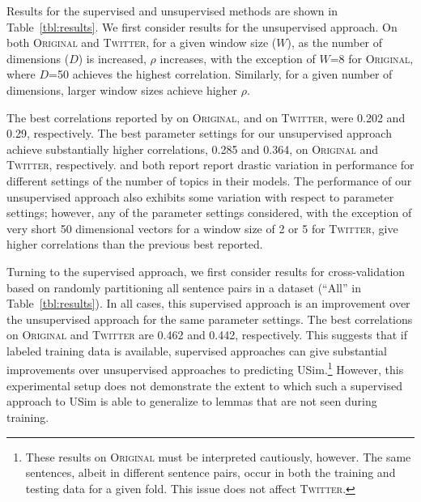 \documentclass[11pt]{article}
\newcommand\original{\textsc{Original}\xspace}
\newcommand\twitter{\textsc{Twitter}\xspace}
\newcommand{\tabref}[1]{Table~\ref{#1}}
\begin{document}
Results for the supervised and unsupervised methods are shown in
\tabref{tbl:results}. We first consider results for the unsupervised
approach. On both \original and \twitter, for a given window size
($W$), as the number of dimensions ($D$) is increased, $\rho$
increases, with the exception of $W$=8 for \original, where $D$=50
achieves the highest correlation. Similarly, for a given number of
dimensions, larger window sizes achieve higher $\rho$.


The best correlations reported by \cite{LuiBaldwin2012} on \original,
and \cite{Gella+:2013} on \twitter, were 0.202 and 0.29,
respectively. The best parameter settings for our unsupervised
approach achieve substantially higher correlations, 0.285 and 0.364,
on \original and \twitter, respectively. \citeauthor{LuiBaldwin2012}
and \citeauthor{Gella+:2013} both report report drastic variation in
performance for different settings of the number of topics in their
models. The performance of our unsupervised approach also exhibits
some variation with respect to parameter settings; however, any of the
parameter settings considered, with the exception of very short 50
dimensional vectors for a window size of 2 or 5 for \twitter, give
higher correlations than the previous best reported.




Turning to the supervised approach, we first consider results for
cross-validation based on randomly partitioning all sentence pairs in
a dataset (``All'' in \tabref{tbl:results}). In all cases, this
supervised approach is an improvement over the unsupervised approach
for the same parameter settings. The best correlations on \original
and \twitter are 0.462 and 0.442, respectively. This suggests that if
labeled training data is available, supervised approaches can give
substantial improvements over unsupervised approaches to predicting
USim.\footnote{These results on \original must be interpreted
  cautiously, however. The same sentences, albeit in different
  sentence pairs, occur in both the training and testing data for a
  given fold. This issue does not affect \twitter.}
However, this experimental setup does not demonstrate the extent to
which such a supervised approach to USim is able to generalize to
lemmas that are not seen during training.
\end{document}
